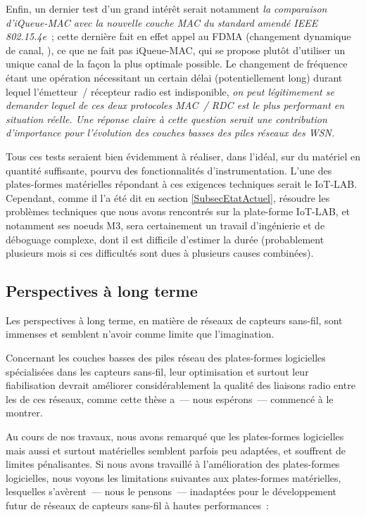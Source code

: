 \medskip

Enfin, un dernier test d'un grand intérêt serait notamment \emph{la 
comparaison d'iQueue-MAC avec la nouvelle couche MAC du standard amendé
IEEE 802.15.4e}~; cette dernière fait en effet appel au FDMA (changement
dynamique de canal, ), ce que ne fait pas
iQueue-MAC, qui se propose plutôt d'utiliser un unique canal de la façon
la plus optimale possible. Le changement de fréquence étant une opération
nécessitant un certain délai (potentiellement long) durant lequel
l'émetteur~/ récepteur radio est indisponible, \emph{on peut légitimement
se demander lequel de ces deux protocoles MAC~/ RDC est le plus performant
en situation réelle. Une réponse claire à cette question serait une
contribution d'importance pour l'évolution des couches basses des piles
réseaux des WSN.}

\medskip

Tous ces tests seraient bien évidemment à réaliser, dans l'idéal,
sur du matériel en quantité suffisante, pourvu des fonctionnalités
d'instrumentation. L'une des plates-formes matérielles répondant à ces
exigences techniques serait le  IoT-LAB. Cependant, comme
il l'a été dit en section \vref{SubsecEtatActuel}, résoudre les problèmes
techniques que nous avons rencontrés sur la plate-forme IoT-LAB, et
notamment ses noeuds M3, sera certainement un travail d'ingénierie et
de déboguage complexe, dont il est difficile d'estimer la durée
(probablement plusieurs mois si ces difficultés sont dues à plusieurs
causes combinées).


\subsection{Perspectives à long terme}
\label{SubsecPerspLong}

Les perspectives à long terme, en matière de réseaux de capteurs sans-fil,
sont immenses et semblent n'avoir comme limite que l'imagination.

\medskip

Concernant les couches basses des piles réseau des plates-formes logicielles
spécialisées dans les capteurs sans-fil, leur optimisation et surtout leur
fiabilisation devrait améliorer considérablement la qualité des liaisons
radio entre les  de ces réseaux, comme cette thèse a~---
nous espérons~--- commencé à le montrer.

\bigskip

Au cours de nos travaux, nous avons remarqué que les plates-formes
logicielles mais aussi et surtout matérielles semblent parfois peu adaptées,
et souffrent de limites pénalisantes. Si nous avons travaillé à
l'amélioration des plates-formes logicielles, nous voyons les limitations
suivantes aux plates-formes matérielles, lesquelles s'avèrent~--- nous le
pensons~--- inadaptées pour le développement futur de réseaux de capteurs
sans-fil à hautes performances~:

